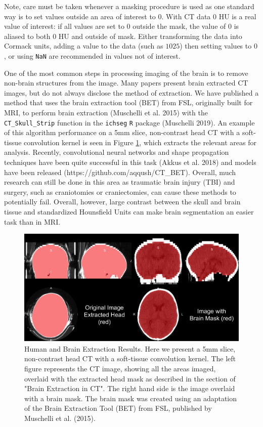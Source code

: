 \documentclass[]{elsarticle} %
\begin{document}
Note, care must be taken whenever a masking procedure is used as one standard way is to set values outside an area of interest to \(0\). With CT data \(0\) HU is a real value of interest: if all values are set to \(0\) outside the mask, the value of \(0\) is aliased to both \(0\) HU and outside of mask. Either transforming the data into Cormack units, adding a value to the data (such as \(1025\)) then setting values to \(0\), or using \texttt{NaN} are recommended in values not of interest.

One of the most common steps in processing imaging of the brain is to remove non-brain structures from the image. Many papers present brain extracted CT images, but do not always disclose the method of extraction. We have published a method that uses the brain extraction tool (BET) from FSL, originally built for MRI, to perform brain extraction (Muschelli et al. 2015) with the \texttt{CT\_Skull\_Strip} function in the \texttt{ichseg} \texttt{R} package (Muschelli 2019). An example of this algorithm performance on a 5mm slice, non-contrast head CT with a soft-tissue convolution kernel is seen in Figure \ref{fig:ss}, which extracts the relevant areas for analysis. Recently, convolutional neural networks and shape propagation techniques have been quite successful in this task (Akkus et al. 2018) and models have been released (https://github.com/aqqush/CT\_BET). Overall, much research can still be done in this area as traumatic brain injury (TBI) and surgery, such as craniotomies or craniectomies, can cause these methods to potentially fail. Overall, however, large contrast between the skull and brain tissue and standardized Hounsfield Units can make brain segmentation an easier task than in MRI.

\begin{figure}
\includegraphics[width=1\linewidth]{index_files/figure-latex/ss-1} \caption{Human and Brain Extraction Results.  Here we present a 5mm slice, non-contrast head CT with a soft-tissue convolution kernel.  The left figure represents the CT image, showing all the areas imaged, overlaid with the extracted head mask as described in the section of "Brain Extraction in CT".  The right hand side is the image overlaid with a brain mask.  The brain mask was created using an adaptation of the Brain Extraction Tool (BET) from FSL, published by Muschelli et al. (2015).}\label{fig:ss}
\end{figure}
\end{document}

